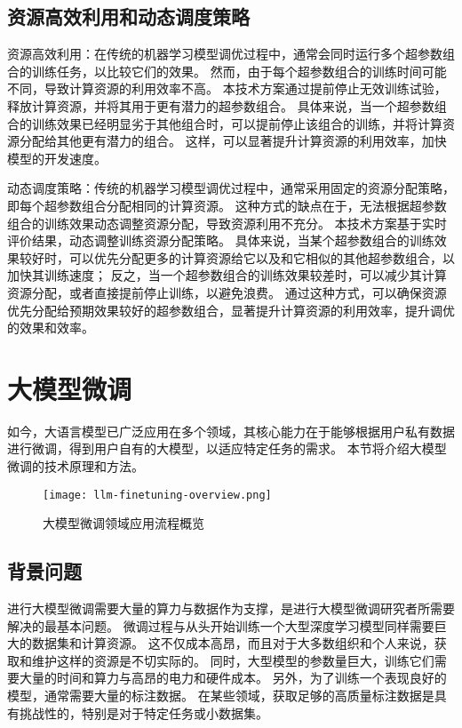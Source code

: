 \subsection{资源高效利用和动态调度策略}

资源高效利用：在传统的机器学习模型调优过程中，通常会同时运行多个超参数组合的训练任务，以比较它们的效果。
然而，由于每个超参数组合的训练时间可能不同，导致计算资源的利用效率不高。
本技术方案通过提前停止无效训练试验，释放计算资源，并将其用于更有潜力的超参数组合。
具体来说，当一个超参数组合的训练效果已经明显劣于其他组合时，可以提前停止该组合的训练，并将计算资源分配给其他更有潜力的组合。
这样，可以显著提升计算资源的利用效率，加快模型的开发速度。

动态调度策略：传统的机器学习模型调优过程中，通常采用固定的资源分配策略，即每个超参数组合分配相同的计算资源。
这种方式的缺点在于，无法根据超参数组合的训练效果动态调整资源分配，导致资源利用不充分。
本技术方案基于实时评价结果，动态调整训练资源分配策略。
具体来说，当某个超参数组合的训练效果较好时，可以优先分配更多的计算资源给它以及和它相似的其他超参数组合，以加快其训练速度；
反之，当一个超参数组合的训练效果较差时，可以减少其计算资源分配，或者直接提前停止训练，以避免浪费。
通过这种方式，可以确保资源优先分配给预期效果较好的超参数组合，显著提升计算资源的利用效率，提升调优的效果和效率。


\section{大模型微调}

如今，大语言模型已广泛应用在多个领域，其核心能力在于能够根据用户私有数据进行微调，得到用户自有的大模型，以适应特定任务的需求。
本节将介绍大模型微调的技术原理和方法。

\begin{figure}
  \centering
  \texttt{[image: llm-finetuning-overview.png]}
  \caption{大模型微调领域应用流程概览}
  \label{fig:finetuning}
\end{figure}

\subsection{背景问题}

进行大模型微调需要大量的算力与数据作为支撑，是进行大模型微调研究者所需要解决的最基本问题。
微调过程与从头开始训练一个大型深度学习模型同样需要巨大的数据集和计算资源。
这不仅成本高昂，而且对于大多数组织和个人来说，获取和维护这样的资源是不切实际的。
同时，大型模型的参数量巨大，训练它们需要大量的时间和算力与高昂的电力和硬件成本。
另外，为了训练一个表现良好的模型，通常需要大量的标注数据。
在某些领域，获取足够的高质量标注数据是具有挑战性的，特别是对于特定任务或小数据集。


